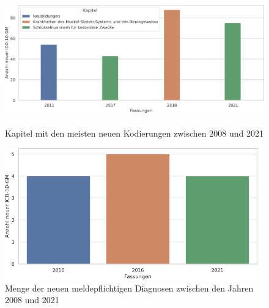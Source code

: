 \begin{figure}[ht]
	\centering
	\includegraphics[height=5.7cm]{figures/kaptnrYear}
	\caption[Kapitel mit den meisten eingeführten \acs{icd10gm} (2008 - 2021)]{Kapitel mit den meisten neuen Kodierungen zwischen 2008 und 2021}
	\label{fig:newicdcap}
\end{figure}

\begin{figure}[ht]
	\centering
	\includegraphics[height=5.7cm]{figures/arztJaYear}
	\caption[Neue meldepflichtige \acs{icd10gm} pro Jahr]{Menge der neuen meldepflichtigen Diagnosen zwischen den Jahren 2008 und 2021}
	\label{fig:newicdmeld}
\end{figure} 

